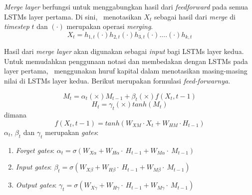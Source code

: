 \begin{enumerate}
	\textit{Merge layer} berfungsi untuk menggabungkan hasil dari \textit{feedforward} pada semua LSTMs layer pertama. Di sini, \saya~menotasikan $ X_t $ sebagai hasil dari \textit{merge} di \textit{timestep} $ t $ dan $ (\cdot) $ merupakan operasi \textit{merging}.
	\begin{equation}\label{eq:merge}
	X_t = h_{1,t} (\cdot) h_{2,t} (\cdot) h_{3,t} (\cdot) .... (\cdot) h_{k,t}
	\end{equation}

	Hasil dari \textit{merge layer} akan digunakan sebagai \textit{input} bagi LSTMs layer kedua. Untuk memudahkan penggunaan notasi dan membedakan dengan LSTMs pada layer pertama, \saya~menggunakan huruf kapital dalam menotasikan masing-masing nilai di LSTMs layer kedua. Berikut merupakan formulasi \textit{feed-forwarnya}.
	
	\begin{equation}\label{eq:mt3}
	M_{t}=\alpha_{t} (\times) M_{t-1} + \beta_{t} (\times) f(X_{t},{t-1})
	\end{equation}
	\begin{equation}\label{eq:ht3}
	H_{t}=\gamma_{t} (\times) tanh(M_{t})
	\end{equation}
	dimana
	\begin{equation}\label{eq:hf3}
	f(X_{t},{t-1})=tanh(W_{XM} \cdot X_{t} + W_{HM} \cdot H_{t-1})
	\end{equation}
	$ \alpha_{t} $, $ \beta_{t} $ dan $ \gamma_{t} $ merupakan \textit{gates}:
	\begin{enumerate}
	\item \textit{Forget gates}: $ \alpha_{t}=\sigma(W_{X\alpha}+W_{H\alpha}\cdot~H_{t-1}+W_{M\alpha}\cdot~M_{t-1}) $
	\item \textit{Input gates}: $ \beta_{t}=\sigma(W_{X\beta}+W_{H\beta}\cdot~H_{t-1}+W_{M\beta}\cdot~M_{t-1}) $
	\item \textit{Output gates}: $ \gamma_{t}=\sigma(W_{X\gamma}+W_{H\gamma}\cdot~H_{t-1}+W_{M\gamma}\cdot~M_{t-1}) $
	\end{enumerate}
		
\end{enumerate}
	
